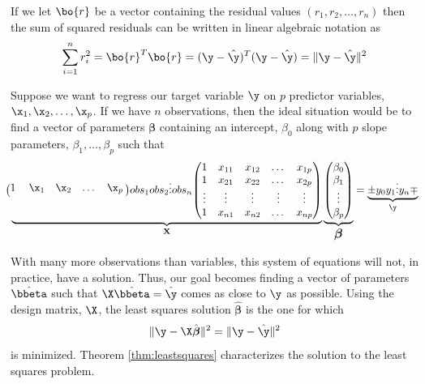 \documentclass[
]{article}
\theoremstyle{definition}
\theoremstyle{definition}
\theoremstyle{definition}
\theoremstyle{definition}
\theoremstyle{remark}
\begin{document}
If we let \(\bo{r}\) be a vector containing the residual values \((r_1,r_2,\dots,r_n)\) then the sum of squared residuals can be written in linear algebraic notation as
\[\sum_{i=1}^n r_i^2 = \bo{r}^T\bo{r}=(\y-\hat{\y})^T(\y-\hat{\y}) = \|\y-\hat{\y}\|^2\]

Suppose we want to regress our target variable \(\y\) on \(p\) predictor variables, \(\x_1,\x_2,\dots,\x_p\). If we have \(n\) observations, then the ideal situation would be to find a vector of parameters \(\boldsymbol\beta\) containing an intercept, \(\beta_0\) along with \(p\) slope parameters, \(\beta_1,\dots,\beta_p\) such that
\begin{equation}
\label{eq:lssystem}
\underbrace{\bordermatrix{1&\x_1 & \x_2 & \dots & \x_p}{obs_1\\obs_2\\ \vdots \\ obs_n}{\left(\begin{matrix}
                      1 &  x_{11} & x_{12} & \dots & x_{1p}\\
                     1 & x_{21} & x_{22} & \dots & x_{2p}\\
                      \vdots & \vdots & \vdots & \vdots &\vdots\\
                     1 & x_{n1} & x_{n2} & \dots & x_{np} \end{matrix}\right) }}_{\LARGE\mathbf{X}}
                      \underbrace{\left(\begin{matrix} \beta_0\\ \beta_1\\  \vdots \\ \beta_p \end{matrix}\right)}_{\LARGE \boldsymbol\beta} 
                      =  \underbrace{\pm y_0\\ y_1 \\ \vdots \\ y_n \mp}_{\LARGE \y} 
\end{equation}

With many more observations than variables, this system of equations will not, in practice, have a solution. Thus, our goal becomes finding a vector of parameters \(\hat{\bbeta}\) such that \(\X\hat{\bbeta}=\hat{\y}\) comes as close to \(\y\) as possible.
Using the design matrix, \(\X\), the least squares solution \(\hat{\boldsymbol\beta}\) is the one for which
\[\|\y-\X\hat{\boldsymbol\beta} \|^2=\|\y-\hat{\y}\|^2\] is minimized. Theorem \ref{thm:leastsquares} characterizes the solution to the least squares problem.
\end{document}

